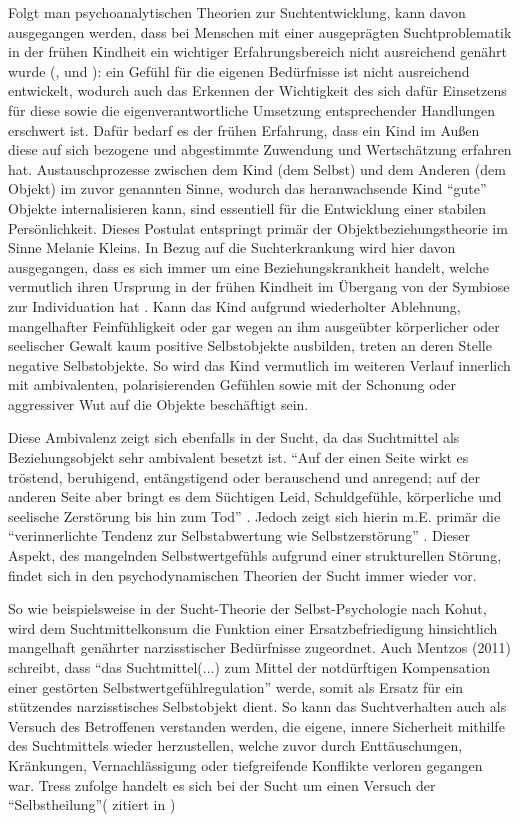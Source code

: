 Folgt man psychoanalytischen Theorien zur Suchtentwicklung, kann davon ausgegangen werden, dass bei Menschen mit einer ausgeprägten Suchtproblematik in der frühen Kindheit ein wichtiger Erfahrungsbereich nicht ausreichend genährt wurde (\cite{mentzos2011}, \cite{weidlinger2012} und \cite{ermann1999}): ein Gefühl für die eigenen Bedürfnisse ist nicht ausreichend entwickelt, wodurch auch das Erkennen der Wichtigkeit des sich dafür Einsetzens für diese sowie die eigenverantwortliche Umsetzung entsprechender Handlungen erschwert ist. Dafür bedarf es der frühen Erfahrung, dass ein Kind im Außen diese auf sich bezogene und abgestimmte Zuwendung und Wertschätzung erfahren hat. Austauschprozesse zwischen dem Kind (dem Selbst) und dem Anderen (dem Objekt) im zuvor genannten Sinne, wodurch das heranwachsende Kind "`gute"' Objekte internalisieren kann, sind essentiell für die Entwicklung einer stabilen Persönlichkeit. Dieses Postulat entspringt primär der Objektbeziehungstheorie im Sinne Melanie Kleins. In Bezug auf die Suchterkrankung wird hier davon ausgegangen, dass es sich immer um eine Beziehungskrankheit handelt, welche vermutlich ihren Ursprung in der frühen Kindheit im Übergang von der Symbiose zur Individuation hat \autocite[vgl.][9]{weidlinger2012}. Kann das Kind aufgrund wiederholter Ablehnung, mangelhafter Feinfühligkeit oder gar wegen an ihm ausgeübter körperlicher oder seelischer Gewalt kaum positive Selbstobjekte ausbilden, treten an deren Stelle negative Selbstobjekte. So wird das Kind vermutlich im weiteren Verlauf innerlich mit ambivalenten, polarisierenden Gefühlen sowie mit der Schonung oder aggressiver Wut auf die Objekte beschäftigt sein\autocite[vgl.][10]{weidlinger2012}. 

Diese Ambivalenz zeigt sich ebenfalls in der Sucht, da das Suchtmittel als Beziehungsobjekt sehr ambivalent besetzt ist. "`Auf der einen Seite wirkt es tröstend, beruhigend, entängstigend oder berauschend und anregend; auf der anderen Seite aber bringt es dem Süchtigen Leid, Schuldgefühle, körperliche und seelische Zerstörung bis hin zum Tod"' \autocite[175]{mentzos2011}. Jedoch zeigt sich hierin m.E. primär die "`verinnerlichte Tendenz zur Selbstabwertung wie Selbstzerstörung"' \autocite[10]{weidlinger2012}. Dieser Aspekt, des mangelnden Selbstwertgefühls aufgrund einer strukturellen Störung, findet sich in den psychodynamischen Theorien der Sucht immer wieder vor. 

So wie beispielsweise in der Sucht-Theorie der Selbst-Psychologie nach Kohut, wird dem Suchtmittelkonsum die Funktion einer Ersatzbefriedigung hinsichtlich mangelhaft genährter narzisstischer Bedürfnisse zugeordnet. Auch Mentzos (2011) schreibt, dass "`das Suchtmittel(...) zum Mittel der notdürftigen Kompensation einer gestörten Selbstwertgefühlregulation"' werde, somit als Ersatz für ein stützendes narzisstisches Selbstobjekt dient. So kann das Suchtverhalten auch als Versuch des Betroffenen verstanden werden, die eigene, innere Sicherheit mithilfe des Suchtmittels wieder herzustellen, welche zuvor durch Enttäuschungen, Kränkungen, Vernachlässigung oder tiefgreifende Konflikte verloren gegangen war. Tress zufolge handelt es sich bei der Sucht um einen Versuch der "`Selbstheilung"'(\cite{tress1985} zitiert in \cite[222]{ermann1999})

